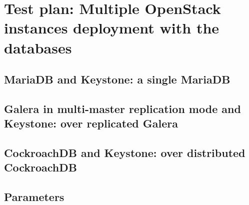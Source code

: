 \label{sec:testplan}
\section{Test plan: Multiple OpenStack instances deployment with the databases}


\subsection{MariaDB and Keystone: a single MariaDB}
\subsection{Galera in multi-master replication mode and Keystone: over replicated Galera}
\subsection{CockroachDB and Keystone: over distributed CockroachDB}

\subsection{Parameters}
